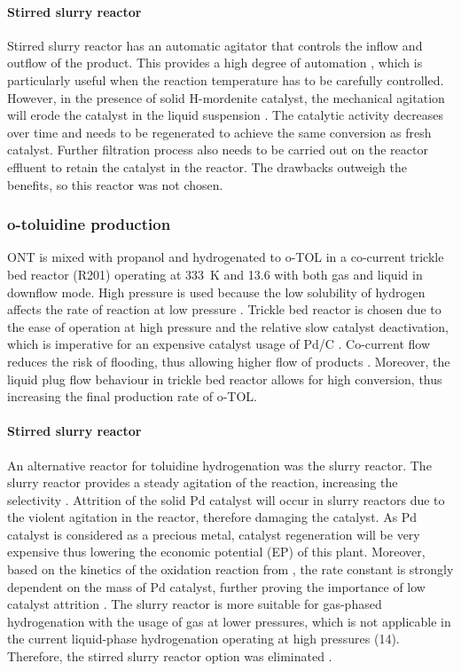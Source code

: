 \paragraph{Stirred slurry reactor}
Stirred slurry reactor has an automatic agitator that controls the inflow and outflow of the product. This provides a high degree of automation \cite{liu_nitration_2019}, which is particularly useful when the reaction temperature has to be carefully controlled. However, in the presence of solid H-mordenite catalyst, the mechanical agitation will erode the catalyst in the liquid suspension \cite{argyle_heterogeneous_2015}. The catalytic activity decreases over time and needs to be regenerated to achieve the same conversion as fresh catalyst. Further filtration process also needs to be carried out on the reactor effluent to retain the catalyst in the reactor. The drawbacks outweigh the benefits, so this reactor was not chosen.


\subsubsection{o-toluidine production}

ONT is mixed with propanol and hydrogenated to o-TOL in a co-current trickle bed reactor (R201) operating at \SI{333}{\K} and \SI{13.6}{\atm} with both gas and liquid in downflow mode. High pressure is used because the low solubility of hydrogen affects the rate of reaction at low pressure \cite{rajadhyaksha_solvent_1986}. Trickle bed reactor is chosen due to the ease of operation at high pressure and the relative slow catalyst deactivation, which is imperative for an expensive catalyst usage of Pd/C \cite{vemala_hydrodynamic_nodate}. Co-current flow reduces the risk of flooding, thus allowing higher flow of products \cite{vemala_hydrodynamic_nodate}. Moreover, the liquid plug flow behaviour in trickle bed reactor allows for high conversion, thus increasing the final production rate of o-TOL. 

\paragraph{Stirred slurry reactor}
An alternative reactor for toluidine hydrogenation was the slurry reactor. The slurry reactor provides a steady agitation of the reaction, increasing the selectivity \cite{p_a_ramachandran_recent_1987}. Attrition of the solid Pd catalyst will occur in slurry reactors due to the violent agitation in the reactor, therefore damaging the catalyst. As Pd catalyst is considered as a precious metal, catalyst regeneration will be very expensive thus lowering the economic potential (EP) of this plant. Moreover, based on the kinetics of the oxidation reaction from  , the rate constant is strongly dependent on the mass of Pd catalyst, further proving the importance of low catalyst attrition \cite{rajadhyaksha_solvent_1986}.
The slurry reactor is more suitable for gas-phased hydrogenation with the usage of  gas at lower pressures, which is not applicable in the current liquid-phase hydrogenation operating at high pressures (\SI{14}{\atm}). Therefore, the stirred slurry reactor option was eliminated \cite{ranade_chapter_2011}.

